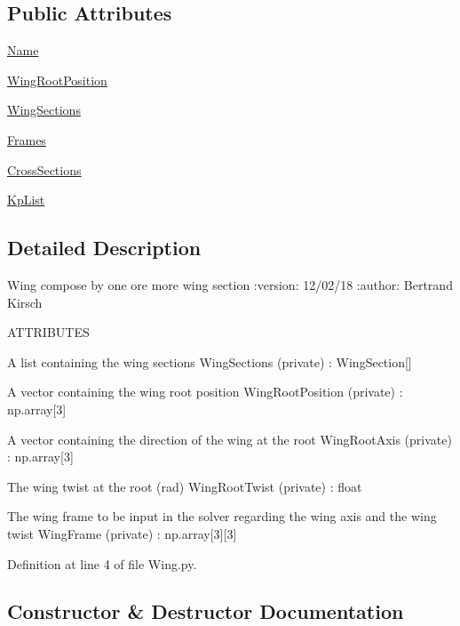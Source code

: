 \subsection*{Public Attributes}
\begin{DoxyCompactItemize}
\item 
\hyperlink{classgebtaero_1_1_wing_1_1_wing_a1c41ea89cf72ec60090134497f1ede15}{Name}
\item 
\hyperlink{classgebtaero_1_1_wing_1_1_wing_aa0957399544603f1df3cdb3b02eeda4a}{Wing\+Root\+Position}
\item 
\hyperlink{classgebtaero_1_1_wing_1_1_wing_a87db863f3c208b18c8e7594d75598a1d}{Wing\+Sections}
\item 
\hyperlink{classgebtaero_1_1_wing_1_1_wing_a4d4a29e2bd610166204d416d182b4b14}{Frames}
\item 
\hyperlink{classgebtaero_1_1_wing_1_1_wing_a31876f71184c1f5330aa22b2a51989ea}{Cross\+Sections}
\item 
\hyperlink{classgebtaero_1_1_wing_1_1_wing_a85da9f70285dd5be8a0983fa39b70fec}{Kp\+List}
\end{DoxyCompactItemize}


\subsection{Detailed Description}
\begin{DoxyVerb}Wing compose by one ore more wing section
:version: 12/02/18
:author: Bertrand Kirsch

ATTRIBUTES

A list containing the wing sections
WingSections (private) : WingSection[]

A vector containing the wing root position
WingRootPosition (private) : np.array[3]

A vector containing the direction of the wing at the root
WingRootAxis (private) : np.array[3]

The wing twist at the root (rad)
WingRootTwist (private) : float

The wing frame to be input in the solver regarding the wing axis and the wing twist
WingFrame (private) : np.array[3][3]        
\end{DoxyVerb}
 

Definition at line 4 of file Wing.\+py.



\subsection{Constructor \& Destructor Documentation}
\mbox{\label{classgebtaero_1_1_wing_1_1_wing_ad4899077f16bf8b8dff5e9ce86c4b2c0}} 
